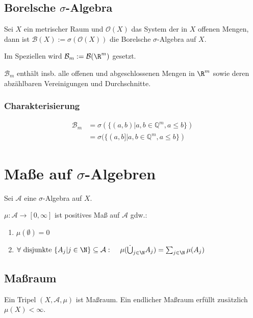\subsection*{Borelsche $\sigma$-Algebra}

Sei $X$ ein metrischer Raum und $\mathcal{O}(X)$ das System der in $X$ offenen Mengen, dann ist $\mathcal{B}(X) := \sigma(\mathcal{O}(X))$ die Borelsche $\sigma$-Algebra auf $X$.

Im Speziellen wird $\mathcal{B}_m := \mathcal{B}(\R^m)$ gesetzt.

$\mathcal{B}_m$ enthält insb. alle offenen und abgeschlossenen Mengen in $\R^m$ sowie deren abzählbaren Vereinigungen und Durchschnitte.

\subsubsection*{Charakterisierung}

\vspace*{-4mm}
\begin{align*}
	\mathcal{B}_m &= \sigma(\{(a, b) | a, b \in \mathbb{Q}^m, a \leq b\}) \\
	              &= \sigma(\{(a, b] | a, b \in \mathbb{Q}^m, a \leq b\})
\end{align*}

\section*{Maße auf $\sigma$-Algebren}

Sei $\mathcal{A}$ eine $\sigma$-Algebra auf $X$.

$\mu : \mathcal{A} \rightarrow [0, \infty]$ ist positives Maß auf $\mathcal{A}$ gdw.:

\begin{enumerate}[label=(\alph*)]
	\item $\mu(\emptyset) = 0$
	\item $\forall \text{ disjunkte } \{A_j | j \in \N\} \subseteq \mathcal{A} :\\ \hspace*{4mm} \mu(\dot\bigcup_{j\in \N} A_j) = \sum_{j\in \N} \mu(A_j)$
\end{enumerate}

\subsection*{Maßraum}

Ein Tripel $(X, \mathcal{A}, \mu)$ ist Maßraum. Ein endlicher Maßraum erfüllt zusätzlich $\mu(X) < \infty$.

